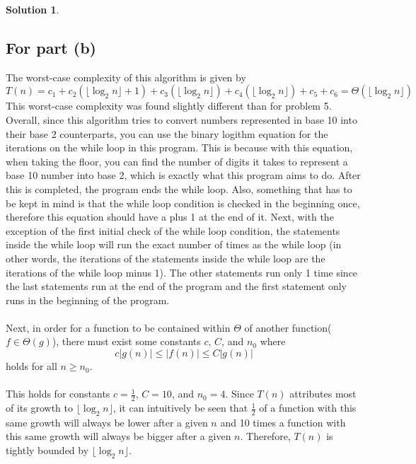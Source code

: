 \documentclass{article}
\theoremstyle{definition}
\newtheorem*{solution}{Solution}
\begin{document}
\begin{solution} 
\hspace{1cm}
\subsection*{For part (b)}
The worst-case complexity of this algorithm is given by\\
$$ T(n) = c_1 + c_2(\lfloor \log_2 n \rfloor + 1) + c_3(\lfloor \log_2 n \rfloor) + c_4(\lfloor \log_2 n \rfloor) + c_5 + c_6 = \Theta(\lfloor \log_2 n \rfloor) $$
This worst-case complexity was found slightly different than for problem 5. Overall, since this algorithm tries to convert numbers represented in base 10 into their base 2 counterparts, you can use the binary logithm equation for the iterations on the while loop in this program. This is because with this equation, when taking the floor, you can find the number of digits it takes to represent a base 10 number into base 2, which is exactly what this program aims to do. After this is completed, the program ends the while loop. Also, something that has to be kept in mind is that the while loop condition is checked in the beginning once, therefore this equation should have a plus 1 at the end of it. Next, with the exception of the first initial check of the while loop condition, the statements inside the while loop will run the exact number of times as the while loop (in other words, the iterations of the statements inside the while loop are the iterations of the while loop minus 1). The other statements run only 1 time since the last statements run at the end of the program and the first statement only runs in the beginning of the program.\\\\
Next, in order for a function to be contained within $\Theta$ of another function($f \in \Theta(g)$), there must exist some constants $c$, $C$, and $n_0$ where
$$ c|g(n)| \leqslant |f(n)| \leqslant C|g(n)| $$
holds for all $n \geqslant n_0$.\\\\
This holds for constants $c = \frac{1}{2}$, $C = 10$, and $n_0 = 4$. Since $T(n)$ attributes most of its growth to $\lfloor \log_2 n \rfloor$, it can intuitively be seen that $\frac{1}{2}$ of a function with this same growth will always be lower after a given $n$ and 10 times a function with this same growth will always be bigger after a given $n$. Therefore, $T(n)$ is tightly bounded by $\lfloor \log_2 n \rfloor$.
\end{solution}
\end{document}
